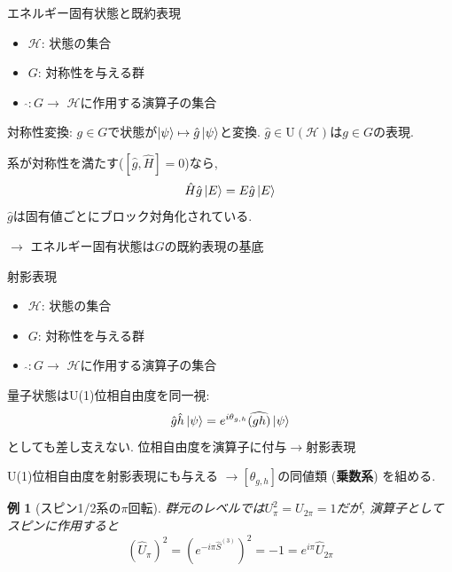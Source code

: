\documentclass[dvipdfm]{beamer}
\newtheorem*{exmpl}{例}
\begin{document}

\begin{frame}{エネルギー固有状態と既約表現}
    \begin{itemize}
        \item $\mathcal{H}$: 状態の集合
        \item $G$: 対称性を与える群
        \item $\widehat{}: G\to$ $\mathcal{H}$に作用する演算子の集合
    \end{itemize}
    対称性変換: $g\in G$で状態が$\ket{\psi}\mapsto\hat{g}\ket{\psi}$と変換.
    $\hat{g}\in\mathrm{U}(\mathcal{H})$は$g\in G$の表現.

    系が対称性を満たす($[\hat{g},\hat{H}]=0$)なら,
    \begin{equation*}
        \hat{H}\hat{g}\ket{E}
        =
        E\hat{g}\ket{E}
    \end{equation*}
    $\hat{g}$は固有値ごとにブロック対角化されている.

    $\longrightarrow$
    \alert{エネルギー固有状態は$G$の既約表現の基底}
\end{frame}

\begin{frame}{射影表現}
    \begin{itemize}
        \item $\mathcal{H}$: 状態の集合
        \item $G$: 対称性を与える群
        \item $\widehat{}: G\to$ $\mathcal{H}$に作用する演算子の集合
    \end{itemize}
    量子状態はU(1)位相自由度を同一視:
    \begin{equation*}
        \hat{g}\hat{h}\ket{\psi}
        =
        e^{i\theta_{g,h}}\widehat{(gh)}\ket{\psi}
    \end{equation*}
    としても差し支えない.
    位相自由度を演算子に付与$\rightarrow$\alert{射影表現}

    U(1)位相自由度を射影表現にも与える
    $\longrightarrow[\theta_{g,h}]$の同値類 (\textbf{乗数系}) を組める.


    \begin{exmpl}[スピン1/2系の$\pi$回転]
        群元のレベルでは$U_\pi^2=U_{2\pi}=1$だが, 演算子としてスピンに作用すると
        \begin{equation*}
            (\hat{U}_\pi)^2
            =
            (e^{-i\pi\hat{S}^{(3)}})^2
            =
            -1
            =
            e^{i\pi}\hat{U}_{2\pi}
        \end{equation*}
    \end{exmpl}
\end{frame}
\end{document}
